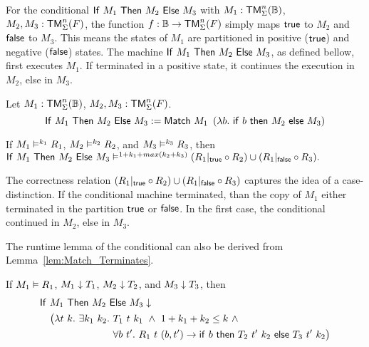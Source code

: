 For the conditional $\mathsf{If}~M_1~\mathsf{Then}~M_2~\mathsf{Else}~M_3$ with $M_1 : \mathsf{TM}_\Sigma^n(\mathbb{B})$, $M_2, M_3 : \mathsf{TM}_\Sigma^n(F)$, the function
$f : \mathbb{B} \rightarrow \mathsf{TM}_\Sigma^n(F)$ simply maps $\mathsf{true}$ to $M_2$ and $\mathsf{false}$ to $M_3$.  This means the states of $M_1$ are partitioned in positive
($\mathsf{true}$) and negative ($\mathsf{false}$) states.  The machine $\mathsf{If}~M_1~\mathsf{Then}~M_2~\mathsf{Else}~M_3$, as defined bellow, first executes $M_1$.  If terminated in a positive
state, it continues the execution in $M_2$, else in $M_3$.

\begin{definition}[Conditional]
  \label{def:If}
  Let $M_1 : \mathsf{TM}_\Sigma^n(\mathbb{B})$, $M_2, M_3 : \mathsf{TM}_\Sigma^n(F)$.
  \[
    \mathsf{If}~M_1~\mathsf{Then}~M_2~\mathsf{Else}~M_3 := \mathsf{Match}~M_1~
    \left(\lambda b.~\mathsf{if}~b~\mathsf{then}~M_2~\mathsf{else}~M_3 \right)
  \]
\end{definition}

\begin{lemma}
  \label{lem:If_RealiseIn}
  If $M_1 \mathrel{\vDash^{k_1}} R_1$, $M_2 \mathrel{\vDash^{k_2}} R_2$, and $M_3 \mathrel{\vDash^{k_3}} R_3$, then
  $
    \mathsf{If}~M_1~\mathsf{Then}~M_2~\mathsf{Else}~M_3 \mathrel{\vDash^{1+k_1+max(k_2+k_3)}} (R_1{|}_{\mathsf{true}} \circ R_2) \cup (R_1{|}_{\mathsf{false}} \circ R_3).
  $
\end{lemma}

The correctness relation $(R_1{|}_{\mathsf{true}} \circ R_2) \cup (R_1{|}_{\mathsf{false}} \circ R_3)$ captures the idea of a case-distinction.  If the conditional machine
terminated, than the copy of $M_1$ either terminated in the partition $\mathsf{true}$ or $\mathsf{false}$.  In the first case, the conditional continued in $M_2$,
else in $M_3$.

The runtime lemma of the conditional can also be derived from Lemma~\ref{lem:Match_Terminates}.
\begin{lemma}
  \label{lem:If_TerminatesIn}
  If $M_1 \mathrel{\vDash} R_1$, $M_1 \mathrel{\downarrow} T_1$, $M_2 \mathrel{\downarrow} T_2$, and $M_3 \mathrel{\downarrow} T_3$, then
  \begin{align*}
    & \mathsf{If}~M_1~\mathsf{Then}~M_2~\mathsf{Else}~M_3 \mathrel{\downarrow} \\
    &\quad \bigl( \lambda t~k.~\exists k_1~k_2.~T_1~t~k_1 ~\land~ 1+k_1+k_2 \leq k ~\land~ \\
    &\quad \phantom{\bigl( \lambda t~k.~\exists k_1~k_2.}~\forall b~t'.~R_1~t~(b, t') \rightarrow \mathsf{if}~b~\mathsf{then}~T_2~t'~k_2~\mathsf{else}~T_3~t'~k_2 \bigr)
  \end{align*}
\end{lemma}


